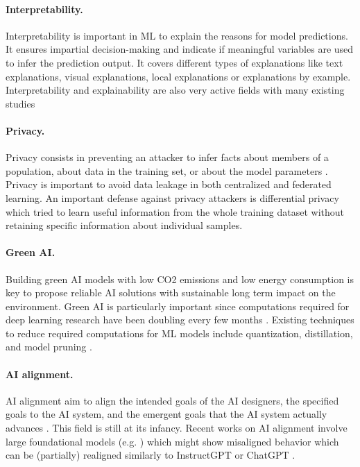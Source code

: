 \paragraph{Interpretability.} Interpretability is important in ML to explain the reasons for model predictions. It ensures impartial decision-making and indicate if meaningful variables are used to infer the prediction output. It covers different types of explanations like text explanations, visual explanations, local explanations or explanations by example. Interpretability and explainability are also very active fields with many existing studies \cite{arrieta2019explainable, overview-interpretable-ml}

\paragraph{Privacy.} Privacy consists in preventing an attacker to infer facts about members of a population, about data in the training set, or about the model parameters \cite{cristofaro2020privacy, cristofaro2021privacy}. Privacy is important to avoid data leakage in both centralized and federated learning. An important defense against privacy attackers is differential privacy \cite{buglesi2006privacy} which tried to learn useful information from the whole training dataset without retaining specific information about individual samples.

\paragraph{Green AI.} Building green AI models with low CO2 emissions and low energy consumption is key to propose reliable AI solutions with sustainable long term impact on the environment. Green AI is particularly important since computations required for deep learning research have been doubling every few months \cite{schwartz2019greenAI}. Existing techniques to reduce required computations for ML models include quantization, distillation, and model pruning \cite{neill2020compression}. 

\paragraph{AI alignment.} AI alignment aim to align the intended goals of the AI designers,  the specified goals to the AI system, and the emergent goals that the AI system actually advances \cite{bostrom2014superintelligence, gabriel2020AI}. This field is still at its infancy. Recent works on AI alignment involve large foundational models (e.g. \cite{gpt, rombach2021highresolution, galactica}) which might show misaligned behavior which can be (partially) realigned similarly to InstructGPT \cite{instructgpt} or ChatGPT \cite{chatgpt}.


